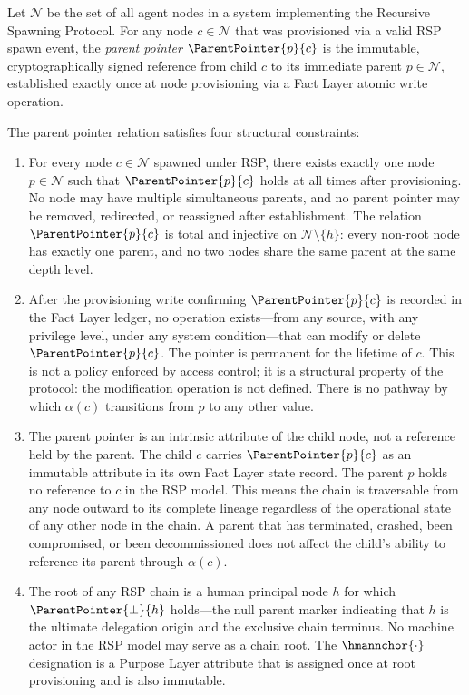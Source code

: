 \begin{definition}
\label{def:parent-pointer}
Let $\mathcal{N}$ be the set of all agent nodes in a \bxthree{} system implementing the Recursive Spawning Protocol. For any node $c \in \mathcal{N}$ that was provisioned via a valid RSP spawn event, the \emph{parent pointer} $\ParentPointer{p}{c}$ is the immutable, cryptographically signed reference from child $c$ to its immediate parent $p \in \mathcal{N}$, established exactly once at node provisioning via a Fact Layer atomic write operation.

The parent pointer relation satisfies four structural constraints:

\begin{enumerate}
    \item[(P1) \textbf{Uniqueness}] For every node $c \in \mathcal{N}$ spawned under RSP, there exists exactly one node $p \in \mathcal{N}$ such that $\ParentPointer{p}{c}$ holds at all times after provisioning. No node may have multiple simultaneous parents, and no parent pointer may be removed, redirected, or reassigned after establishment. The relation $\ParentPointer{p}{c}$ is total and injective on $\mathcal{N} \setminus \{h\}$: every non-root node has exactly one parent, and no two nodes share the same parent at the same depth level.

    \item[(P2) \textbf{Immutability}] After the provisioning write confirming $\ParentPointer{p}{c}$ is recorded in the Fact Layer ledger, no operation exists---from any source, with any privilege level, under any system condition---that can modify or delete $\ParentPointer{p}{c}$. The pointer is permanent for the lifetime of $c$. This is not a policy enforced by access control; it is a structural property of the protocol: the modification operation is not defined. There is no pathway by which $\alpha(c)$ transitions from $p$ to any other value.

    \item[(P3) \textbf{Directionality}] The parent pointer is an intrinsic attribute of the child node, not a reference held by the parent. The child $c$ carries $\ParentPointer{p}{c}$ as an immutable attribute in its own Fact Layer state record. The parent $p$ holds no reference to $c$ in the RSP model. This means the chain is traversable from any node outward to its complete lineage regardless of the operational state of any other node in the chain. A parent that has terminated, crashed, been compromised, or been decommissioned does not affect the child's ability to reference its parent through $\alpha(c)$.

    \item[(P4) \textbf{Termination at Human Anchor}] The root of any RSP chain is a human principal node $h$ for which $\ParentPointer{\bot}{h}$ holds---the null parent marker indicating that $h$ is the ultimate delegation origin and the exclusive chain terminus. No machine actor in the RSP model may serve as a chain root. The $\hmannchor{\cdot}$ designation is a Purpose Layer attribute that is assigned once at root provisioning and is also immutable.
\end{enumerate}
\end{definition}

